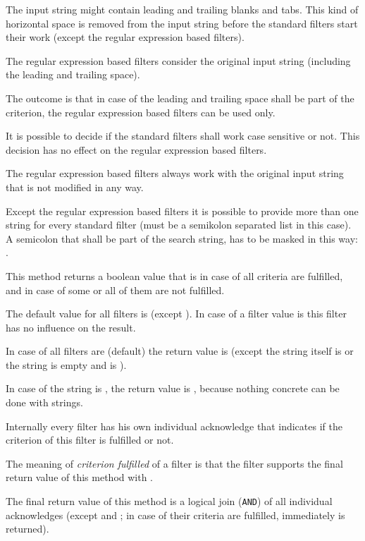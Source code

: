 The input string might contain leading and trailing blanks and tabs. This kind of horizontal space is removed from the input string
before the standard filters start their work (except the regular expression based filters).

The regular expression based filters consider the original input string (including the leading and trailing space). 

The outcome is that in case of the leading and trailing space shall be part of the criterion, the regular expression based filters can be used only.

It is possible to decide if the standard filters shall work case sensitive or not. This decision has no effect on the regular expression based filters.

The regular expression based filters always work with the original input string that is not modified in any way.

Except the regular expression based filters it is possible to provide more than one string for every standard filter (must be a semikolon separated list in this case).
A semicolon that shall be part of the search string, has to be masked in this way: .

This method returns a boolean value that is  in case of all criteria are fulfilled, and  in case of some or all of them are not fulfilled.

The default value for all filters is  (except ). In case of a filter value is  this filter
has no influence on the result.

In case of all filters are  (default) the return value is  (except the string itself is 
or the string is empty and  is ).

In case of the string is , the return value is , because nothing concrete can be done with  strings.

Internally every filter has his own individual acknowledge that indicates if the criterion of this filter is fulfilled or not.

The meaning of \textit{criterion fulfilled} of a filter is that the filter supports the final return value  of this method with .

The final return value  of this method is a logical join (\texttt{AND}) of all individual acknowledges (except 
and ; in case of their criteria are fulfilled, immediately  is returned).

